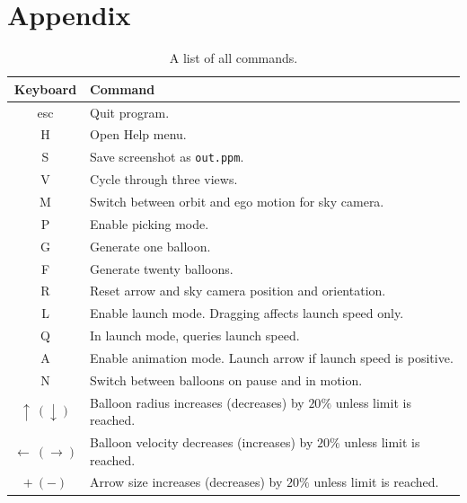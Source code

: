 \documentclass{article}[12pt]
\begin{document}
\section*{Appendix\label{sec:app}}
\begin{table}[h]
    \centering
    \begin{tabular}{c|l}
\hline Keyboard &   Command  \\\hline
       esc  & Quit program. \\
       H & Open Help menu. \\
       S & Save screenshot as \texttt{out.ppm}.\\
       V & Cycle through three views. \\
       M & Switch between orbit and ego motion for sky camera. \\
       P & Enable picking mode. \\
       G & Generate one balloon. \\
       F & Generate twenty balloons. \\
       R & Reset arrow and sky camera position and orientation.\\
       L & Enable launch mode. Dragging affects launch speed only. \\
       Q & In launch mode, queries launch speed.\\
       A & Enable animation mode. Launch arrow if launch speed is positive. \\
       N & Switch between balloons on pause and in motion.\\
       $\uparrow~(\downarrow)$ & Balloon radius increases (decreases) by $20\%$ unless limit is reached. \\
       $\leftarrow~(\rightarrow)$ & Balloon velocity decreases (increases) by $20\%$ unless limit is reached. \\
       $+~(-)$ & Arrow size increases (decreases) by $20\%$ unless limit is reached. \\
    \end{tabular}
    \caption{A list of all commands.}
    \label{tab:appendix}
\end{table}
\end{document}
